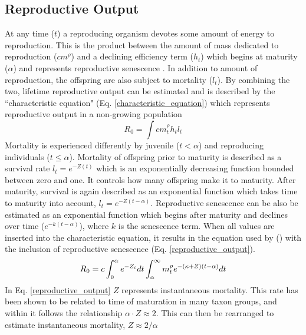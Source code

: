 \documentclass[a4paper, 11pt, hidelinks]{article} %
\begin{document}
	
	
	\subsection{Reproductive Output}
	At any time ($ t $) a reproducing organism devotes some amount of energy to reproduction.  This is the product between the amount of mass dedicated to reproduction ($ cm^\rho $) and a declining efficiency term ($ h_t $) which begins at maturity ($ \alpha $) and represents reproductive senescence \parencite{Benoit2018, Vrtilek2018, Stearns2000}.  In addition to amount of reproduction, the offspring are also subject to mortality ($ l_t $).  By combining the two, lifetime reproductive output can be estimated and is described by the ``characteristic equation" (Eq. \ref{characteristic_equation}) which represents reproductive output in a non-growing population \parencite{Tsoukali2016, roff1993, Roff2001, stearns1992evolution, Arendt2011, Roff1986, Roff1984}
	\begin{equation}
		\label{characteristic_equation}
		R_0 = \int c m_t^\rho h_t l_t 
	\end{equation}
	Mortality is experienced differently by juvenile ($ t < \alpha $) and reproducing individuals ($ t \leq \alpha $). %
	Mortality of offspring prior to maturity is described as a survival rate $ l_t = e^{-Z(t)} $ which is an exponentially decreasing function bounded between zero and one.  It controls how many offspring make it to maturity.  After maturity, survival is again described as an exponential function which takes time to maturity into account, $ l_t = e^{-Z(t-\alpha)} $.  
	Reproductive senescence can be also be estimated as an exponential function which begins after maturity and declines over time  ($ e^{-k(t-\alpha)} $), where $ k $ is the senescence term.  When all values are inserted into the characteristic equation, it results in the equation used by \citeauthor{Charnov2001} (\citeyear{Charnov2001}) with the inclusion of reproductive senescence (Eq. \ref{reproductive_output}).
	\begin{equation}
		\label{reproductive_output}
		R_0 = c\int_0^\alpha e^{-Z_t} dt  \int_\alpha^\infty m_t^\rho e^{-(\kappa + Z)(t - \alpha)}dt\\
	\end{equation} 
	In Eq. \ref{reproductive_output} $ Z $ represents instantaneous mortality.  This rate has been shown to be related to time of maturation in many taxon groups, and within it follows the relationship $ \alpha \cdot Z \approx  2$.  This can then be rearranged to estimate instantaneous mortality, $ Z \approx 2/\alpha  $
	
\end{document}
